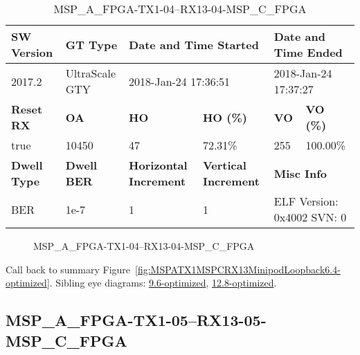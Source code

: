 \begin{table}[h]
\centering
\caption{MSP\_A\_FPGA-TX1-04--RX13-04-MSP\_C\_FPGA}
\label{tab:MSPAFPGATX104RX1304MSPCFPGA6.4-optimized}
\begin{tabular}{@{}|l|l|l|l|l|l|@{}}
\toprule
\textbf{SW Version}                & \textbf{GT Type}   & \multicolumn{2}{l|}{\textbf{Date and Time Started}}            & \multicolumn{2}{l|}{\textbf{Date and Time Ended}}        \\ \midrule
2017.2                       & UltraScale GTY          & \multicolumn{2}{l|}{2018-Jan-24 17:36:51}                   & \multicolumn{2}{l|}{2018-Jan-24 17:37:27}               \\ \midrule
\textbf{Reset RX}                  & \textbf{OA} & \textbf{HO}   & \textbf{HO (\%)} & \textbf{VO} & \textbf{VO (\%)} \\ \midrule
true & 10450        & 47          & 72.31\%        & 255        & 100.00\%       \\ \midrule
\textbf{Dwell Type}                & \textbf{Dwell BER} & \textbf{Horizontal Increment} & \textbf{Vertical Increment}    & \multicolumn{2}{l|}{\textbf{Misc Info}}                  \\ \midrule
BER                            & 1e-7        & 1        & 1           & \multicolumn{2}{l|}{ELF Version: 0x4002 SVN: 0}                         \\ \bottomrule
\end{tabular}
\end{table}

\begin{figure}[h]
\caption{MSP\_A\_FPGA-TX1-04--RX13-04-MSP\_C\_FPGA} \label{fig:MSPAFPGATX104RX1304MSPCFPGA6.4-optimized}
\end{figure}

Call back to summary Figure~\ref{fig:MSPATX1MSPCRX13MinipodLoopback6.4-optimized}.
Sibling eye diagrams: \hyperref[sec:MSPAFPGATX104RX1304MSPCFPGA9.6-optimized]{9.6-optimized}, \hyperref[sec:MSPAFPGATX104RX1304MSPCFPGA12.8-optimized]{12.8-optimized}.

\clearpage
\newpage


\subsection{MSP\_A\_FPGA-TX1-05--RX13-05-MSP\_C\_FPGA}\label{sec:MSPAFPGATX105RX1305MSPCFPGA6.4-optimized}


